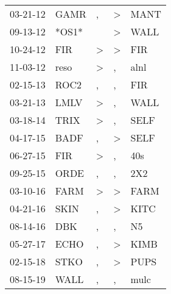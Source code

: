 \begin{supertabular}{lllll}
 03-21-12 &   GAMR &                , &  \textgreater &   MANT \\
 09-13-12 &  *OS1* &                  &  \textgreater &   WALL \\
 10-24-12 &    FIR &     \textgreater &  \textgreater &    FIR \\
 11-03-12 &   reso &     \textgreater &             , &   alnl \\
 02-15-13 &   ROC2 &                , &             , &    FIR \\
 03-21-13 &   LMLV &     \textgreater &             , &   WALL \\
 03-18-14 &   TRIX &     \textgreater &             , &   SELF \\
 04-17-15 &   BADF &                , &  \textgreater &   SELF \\
 06-27-15 &    FIR &     \textgreater &             , &    40s \\
 09-25-15 &   ORDE &                , &             , &    2X2 \\
 03-10-16 &   FARM &     \textgreater &  \textgreater &   FARM \\
 04-21-16 &   SKIN &                , &  \textgreater &   KITC \\
 08-14-16 &    DBK &                , &             , &     N5 \\
 05-27-17 &   ECHO &                , &  \textgreater &   KIMB \\
 02-15-18 &   STKO &                , &  \textgreater &   PUPS \\
 08-15-19 &   WALL &                , &             , &   mulc \\
\end{supertabular}
